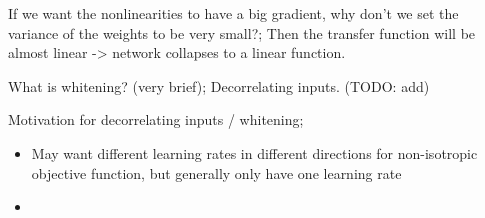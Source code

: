 \documentclass{article}
\begin{document}
If we want the nonlinearities to have a big gradient, why don't we set the variance of the weights to be very small?; Then the transfer function will be almost linear -> network collapses to a linear function.

What is whitening? (very brief); Decorrelating inputs. (TODO: add)

Motivation for decorrelating inputs / whitening; \begin{itemize}
    \item May want different learning rates in different directions for non-isotropic objective function, but generally only have one learning rate
    \item 
\end{itemize}
\end{document}
